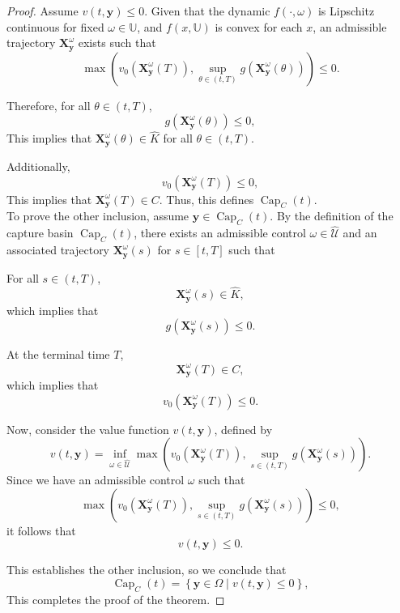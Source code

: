 \documentclass[10pt,a4paper]{amsart}
\begin{document}
\begin{proof}
Assume \( v(t, \mathbf{y}) \leq 0 \). Given that the dynamic \( f(\cdot,\omega) \) is Lipschitz continuous for fixed $\omega\in \mathbb{U}$, and \( f(x, \mathbb{U}) \) is convex for each $x$, an admissible trajectory \( \mathbf{X}_{\mathbf{y}}^\omega \) exists such that
\[
\max \left( v_0(\mathbf{X}_{\mathbf{y}}^\omega(T)), \sup_{\theta \in (t, T)} g\left(\mathbf{X}_{\mathbf{y}}^\omega(\theta)\right) \right) \leq 0.
\]

Therefore, for all \( \theta \in (t, T) \),
\[
g\left(\mathbf{X}_{\mathbf{y}}^\omega(\theta)\right) \leq 0,
\]
This implies that \( \mathbf{X}_{\mathbf{y}}^\omega(\theta) \in \hat{K} \) for all \( \theta \in (t, T) \).

Additionally,
\[
v_0(\mathbf{X}_{\mathbf{y}}^\omega(T)) \leq 0,
\]
This implies that \( \mathbf{X}_{\mathbf{y}}^\omega(T) \in C \). Thus, this defines \( \operatorname{Cap}_{C}(t) \).\\
To prove the other inclusion, assume \( \mathbf{y} \in \operatorname{Cap}_{C}(t) \). By the definition of the capture basin \( \operatorname{Cap}_{C}(t) \), there exists an admissible control \( \omega \in \hat{\mathcal{U}} \) and an associated trajectory \( \mathbf{X}_{\mathbf{y}}^\omega(s) \) for \( s \in [t, T] \) such that

For all \( s \in (t, T) \),
\[
\mathbf{X}_{\mathbf{y}}^\omega(s) \in \hat{K},
\]
which implies that
\[
g\left(\mathbf{X}_{\mathbf{y}}^\omega(s)\right) \leq 0.
\]

At the terminal time \( T \),
\[
\mathbf{X}_{\mathbf{y}}^\omega(T) \in C,
\]
which implies that
\[
v_0\left(\mathbf{X}_{\mathbf{y}}^\omega(T)\right) \leq 0.
\]

Now, consider the value function \( v(t, \mathbf{y}) \), defined by
\[
v(t, \mathbf{y}) = \inf_{\omega \in \hat{\mathcal{U}}} \max \left( v_0\left(\mathbf{X}_{\mathbf{y}}^\omega(T)\right), \sup_{s \in (t, T)} g\left(\mathbf{X}_{\mathbf{y}}^\omega(s)\right) \right).
\]
Since we have an admissible control \( \omega \) such that
\[
\max \left( v_0\left(\mathbf{X}_{\mathbf{y}}^\omega(T)\right), \sup_{s \in (t, T)} g\left(\mathbf{X}_{\mathbf{y}}^\omega(s)\right) \right) \leq 0,
\]
it follows that
\[
v(t, \mathbf{y}) \leq 0.
\]

This establishes the other inclusion, so we conclude that
\[
\operatorname{Cap}_{C}(t) = \left\{ \mathbf{y} \in \Omega \mid v(t, \mathbf{y}) \leq 0 \right\},
\]
This completes the proof of the theorem.
\end{proof}
\end{document}
